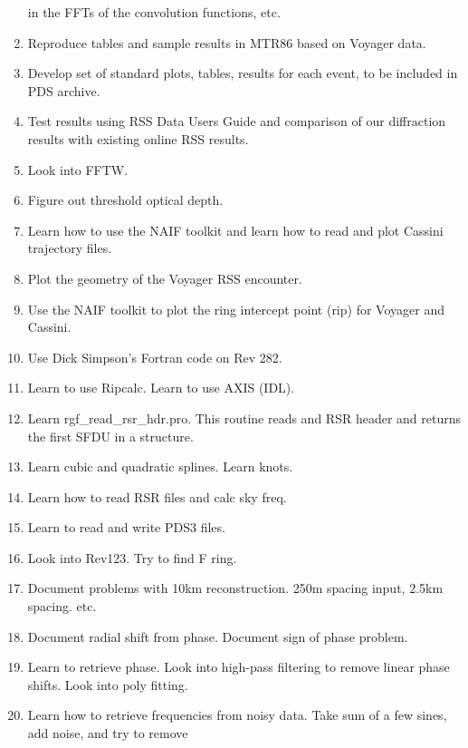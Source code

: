 \documentclass[crop=false,class=article,oneside]{standalone}
\begin{document}
\begin{enumerate}
                  in the FFTs of the convolution functions, etc.
            \item Reproduce tables and sample results in MTR86
                  based on Voyager data.
            \item Develop set of standard plots, tables, results
                  for each event, to be included in PDS archive.
            \item Test results using RSS Data Users Guide and
                  comparison of our diffraction results with
                  existing online RSS results.
            \item Look into FFTW.
            \item Figure out threshold optical depth.
            \item Learn how to use the NAIF toolkit and learn
                  how to read and plot Cassini trajectory files.
            \item Plot the geometry of the Voyager RSS encounter.
            \item Use the NAIF toolkit to plot the ring
                  intercept point (rip) for Voyager and Cassini.
            \item Use Dick Simpson's Fortran code on Rev 282.
            \item Learn to use Ripcalc. Learn to use AXIS (IDL).
            \item Learn rgf\_read\_rsr\_hdr.pro. 
                  This routine reads and RSR header and returns
                  the first SFDU in a structure.
            \item Learn cubic and quadratic splines. Learn knots.
            \item Learn how to read RSR files and calc sky freq.
            \item Learn to read and write PDS3 files.
            \item Look into Rev123. Try to find F ring.
            \item Document problems with 10km reconstruction.
                  250m spacing input, 2.5km spacing. etc.
            \item Document radial shift from phase. Document
                  sign of phase problem.
            \item Learn to retrieve phase. Look into high-pass filtering
                  to remove linear phase shifts. Look into poly fitting.
            \item Learn how to retrieve frequencies from noisy data.
                  Take sum of a few sines, add noise, and try to remove

\end{enumerate}
\end{document}
